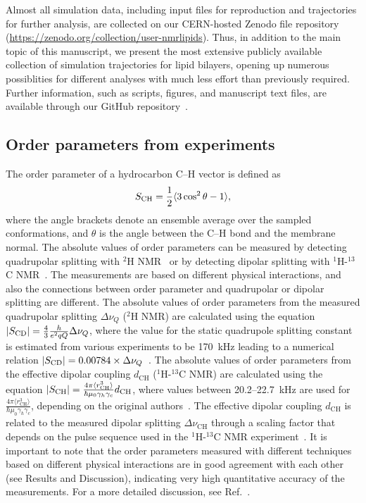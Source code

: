 \documentclass[journal=jpcbfk,manuscript=article]{achemso}
\begin{document}
Almost all simulation data, including input files for reproduction and trajectories for further analysis, are collected
on our CERN-hosted Zenodo file repository (\url{https://zenodo.org/collection/user-nmrlipids}).
Thus, in addition to the main topic of this manuscript, we present the most extensive publicly available collection of simulation trajectories
for lipid bilayers, opening up numerous possiblities for different analyses with much less effort than previously required.
Further information, such as scripts, figures, and manuscript text files, are available through our GitHub 
repository~\cite{NMRLipidsGit}.%


\subsection{Order parameters from experiments}\label{expORDp}
The order parameter of a hydrocarbon C--H vector is defined as 
\begin{equation}\label{orderP}
S_{{\rm CH}}=\frac{1}{2}\langle 3 \cos^2 \theta-1 \rangle,
\end{equation} 
where the angle brackets denote an ensemble average over the sampled conformations, and $\theta$ is the angle between the C--H bond and the membrane normal.
The absolute values of order parameters can be measured by detecting quadrupolar splitting with $^2$H NMR~\cite{seelig77c} or by detecting dipolar 
splitting with $^1$H-$^{13}$C NMR~\cite{hong95a,gross97,dvinskikh05a,ferreira13}. The measurements are based on
different physical interactions, and also the connections between order parameter and quadrupolar or dipolar splitting
are different. The absolute values of order parameters from the measured quadrupolar splitting $\Delta \nu_Q$ ($^2$H NMR) are calculated using 
the equation $|S_{{\rm CD}}|=\frac{4}{3} \frac{h}{e^2qQ} \Delta \nu_Q$, where the value for the static quadrupole
splitting constant is estimated from various experiments to be 170~kHz leading to a numerical relation 
$|S_{{\rm CD}}|=0.00784 \times \Delta \nu_Q$~\cite{seelig77c}. 
The absolute values of order parameters from the effective dipolar coupling $d_\mathrm{CH}$ ($^1$H-$^{13}$C NMR) are calculated using the equation
$|S_{{\rm CH}}|=\frac{4\pi\langle r_\mathrm{CH}^3 \rangle}{\hbar \mu_0 \gamma_h \gamma_c} d_\mathrm{CH}$, where
values between 20.2--22.7~kHz are used for $\frac{4\pi\langle r_\mathrm{CH}^3 \rangle}{\hbar \mu_0 \gamma_h \gamma_c}$,
depending on the original authors~\cite{hong95a,gross97,dvinskikh05a,ferreira13}.
The effective dipolar coupling $d_\mathrm{CH}$ is related to the measured dipolar splitting $\Delta \nu_\mathrm{CH}$ 
through a scaling factor that depends on the pulse sequence used in the $^1$H-$^{13}$C NMR experiment~\cite{hong95a,gross97,dvinskikh05a,ferreira13}.
It is important to note that the order parameters measured with different techniques based on different physical interactions are in good agreement
with each other (see Results and Discussion), indicating very high quantitative accuracy of the measurements.
For a more detailed discussion, see Ref.~. 
\end{document}
